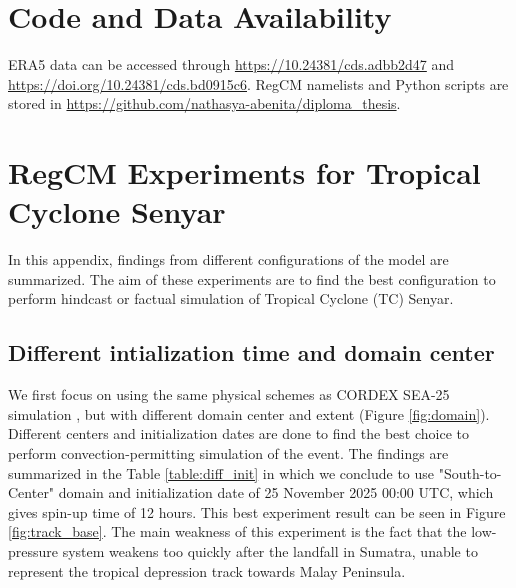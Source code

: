 \appendix

\chapter{Code and Data Availability} 
\label{appendix:code_and_data}

ERA5 data can be accessed through \url{https://10.24381/cds.adbb2d47} and \url{https://doi.org/10.24381/cds.bd0915c6}. RegCM namelists and Python scripts are stored in \url{https://github.com/nathasya-abenita/diploma_thesis}.

\chapter{RegCM Experiments for Tropical Cyclone Senyar}
\label{appendix:exp}

In this appendix, findings from different configurations of the model are summarized. The aim of these experiments are to find the best configuration to perform hindcast or factual simulation of Tropical Cyclone (TC) Senyar.

\section*{Different intialization time and domain center}

We first focus on using the same physical schemes as CORDEX SEA-25 simulation \citep{coppola20255th}, but with different domain center and extent (Figure \ref{fig:domain}). Different centers and initialization dates are done to find the best choice to perform convection-permitting simulation of the event. The findings are summarized in the Table \ref{table:diff_init} in which we conclude to use "South-to-Center" domain and initialization date of 25 November 2025 00:00 UTC, which gives spin-up time of 12 hours. This best experiment result can be seen in Figure \ref{fig:track_base}. The main weakness of this experiment is the fact that the low-pressure system weakens too quickly after the landfall in Sumatra, unable to represent the tropical depression track towards Malay Peninsula.

